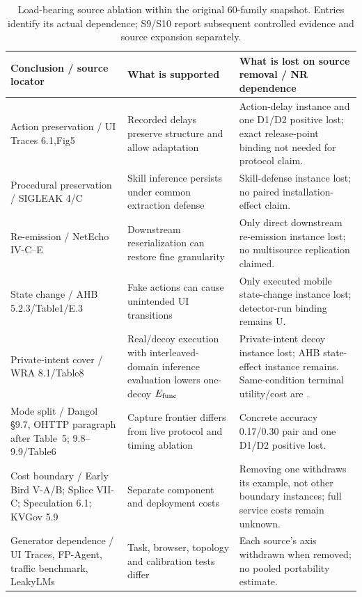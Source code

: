 \begin{table}[t]\centering\footnotesize
\caption{Load-bearing source ablation within the original 60-family snapshot. Entries identify its actual dependence; S9/S10 report subsequent controlled evidence and source expansion separately.}\label{tab:source-dependencies}
\begin{tabularx}{\textwidth}{@{}p{}YY@{}}\toprule
Conclusion / source locator & What is supported & What is lost on source removal / NR dependence\\\midrule
Action preservation / UI Traces 6.1,Fig5 & Recorded delays preserve structure and allow adaptation & Action-delay instance and one D1/D2 positive lost; exact release-point binding not needed for protocol claim.\\
Procedural preservation / SIGLEAK 4/C & Skill inference persists under common extraction defense & Skill-defense instance lost; no paired installation-effect claim.\\
Re-emission / NetEcho IV-C--E & Downstream reserialization can restore fine granularity & Only direct downstream re-emission instance lost; no multisource replication claimed.\\
State change / AHB 5.2.3/Table1/E.3 & Fake actions can cause unintended UI transitions & Only executed mobile state-change instance lost; detector-run binding remains U.\\
Private-intent cover / WRA 8.1/Table8 & Real/decoy execution with interleaved-domain inference evaluation lowers one-decoy $E_{\rm func}$ & Private-intent decoy instance lost; AHB state-effect instance remains. Same-condition terminal utility/cost are \NRR{}.\\
Mode split / Dangol \S9.7, OHTTP paragraph after Table~5; 9.8--9.9/Table6 & Capture frontier differs from live protocol and timing ablation & Concrete accuracy 0.17/0.30 pair and one D1/D2 positive lost.\\
Cost boundary / Early Bird V-A/B; Splice VII-C; Speculation 6.1; KVGov 5.9 & Separate component and deployment costs & Removing one withdraws its example, not other boundary instances; full service costs remain unknown.\\
Generator dependence / UI Traces, FP-Agent, traffic benchmark, LeakyLMs & Task, browser, topology and calibration tests differ & Each source's axis withdrawn when removed; no pooled portability estimate.\\\bottomrule
\end{tabularx}\end{table}
